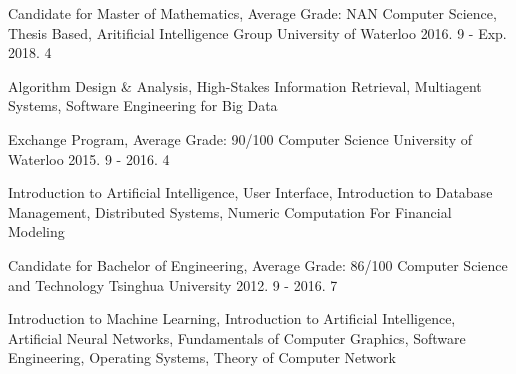 \begin{cventries}
 
  \cventry
    {Candidate for Master of Mathematics, Average Grade: NAN}
    {Computer Science, Thesis Based, Aritificial Intelligence Group}
    {University of Waterloo}
    {2016. 9 - Exp. 2018. 4}
    {
      \begin{cvitems}
      \item{Algorithm Design \& Analysis, High-Stakes Information Retrieval, Multiagent Systems, Software Engineering for Big Data}
      \end{cvitems}
    }

  \cventry
    {Exchange Program, Average Grade: 90/100}
    {Computer Science}
    {University of Waterloo}
    {2015. 9 - 2016. 4}
    {
      \begin{cvitems}
        \item {Introduction to Artificial Intelligence, User Interface, Introduction to Database Management, Distributed Systems, Numeric Computation For Financial Modeling}
      \end{cvitems}
    }
  \cventry
    {Candidate for Bachelor of Engineering, Average Grade: 86/100}
    {Computer Science and Technology}
    {Tsinghua University}
    {2012. 9 - 2016. 7}
    {
      \begin{cvitems}
        \item {Introduction to Machine Learning, Introduction to Artificial Intelligence, Artificial Neural Networks, Fundamentals of Computer Graphics, Software Engineering, Operating Systems, Theory of Computer Network}
      \end{cvitems}
    }

\end{cventries}
